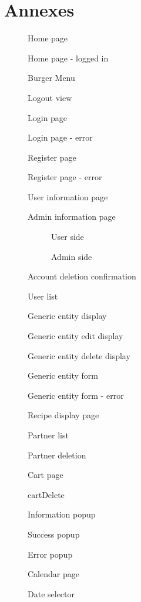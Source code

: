 \documentclass[english,12pt,twoside,a4paper]{article}
\newcommand{\image}[4]{
  \begin{figure}[ht]
    \centering
    \fbox{\texttt{[image: \#1]}}
    \caption{#3}
    \label{fig:#4}
  \end{figure}
}
\begin{document}
\section{Annexes}
\image{mockups/homePage}{0.7}{Home page}{homePage}
\vfill
\image{mockups/homePageLoggedIn}{0.7}{Home page - logged in}{homePage}
\vfill
\image{mockups/burgerMenu}{0.75}{Burger Menu}{burgerMenu}
\vfill
\image{mockups/logout}{0.75}{Logout view}{lougout}
\vfill
\image{mockups/loginPage}{0.75}{Login page}{loginPage}
\vfill
\image{mockups/loginError}{0.75}{Login page - error}{loginPageError}
\vfill
\image{mockups/registerPage}{0.75}{Register page}{registerPage}
\vfill
\image{mockups/registerPageError}{0.75}{Register page - error}{regsiterPageError}
\vfill
\image{mockups/userInformation}{0.75}{User information page}{userInformation}
\vfill
\image{mockups/adminInformation}{0.75}{Admin information page}{adminInformation}
\vfill
\begin{figure}[h]
  \begin{subfigure}{0.45\linewidth}
    \caption{User side}
  \end{subfigure}
  \hfill
  \begin{subfigure}{0.45\linewidth}
    \caption{Admin side}
  \end{subfigure}
  \caption{Account deletion confirmation}
  \label{fig:acountDeletionConfirmation}
\end{figure}
\vfill
\image{mockups/userList}{0.75}{User list}{userList}
\vfill
\image{mockups/genericEntityDisplay}{0.75}{Generic entity display}{genericEntityDisplay}
\vfill
\image{mockups/genericEntityEditDisplay}{0.75}{Generic entity edit display}{genericEntityEditDisplay}
\vfill
\image{mockups/genericEntityDeleteDisplay}{0.75}{Generic entity delete display}{genericEntityDeleteDisplay}
\vfill
\image{mockups/genericForm}{0.6}{Generic entity form}{genericForm}
\vfill
\image{mockups/genericFormError}{0.6}{Generic entity form - error}{genericFormError}
\vfill
\image{mockups/recipeViewAndComment}{0.75}{Recipe display page}{recipeViewAndComment}
\vfill
\image{mockups/partnerList}{0.75}{Partner list}{partnerList}
\vfill
\image{mockups/partnerDelete}{0.75}{Partner deletion}{partnerDelete}
\vfill
\image{mockups/cart}{0.75}{Cart page}{cartPage}
\vfill
\image{mockups/cartDelete}{0.75}{cartDelete}{cartDelete}
\vfill
\image{mockups/infoPopup}{0.75}{Information popup}{infoPopup}
\vfill
\image{mockups/successPopup}{0.75}{Success popup}{successPopup}
\vfill
\image{mockups/errorPopup}{0.75}{Error popup}{errorPopup}
\vfill
\image{mockups/calendarView}{0.75}{Calendar page}{calendarPage}
\vfill
\image{mockups/dateSelector}{0.75}{Date selector}{dateSelector}
\vfill
\end{document}
